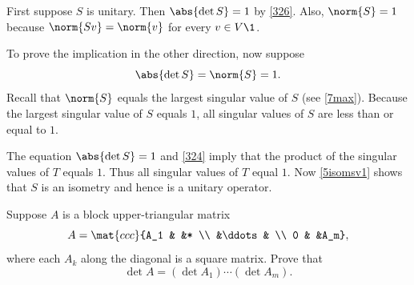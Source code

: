 \begin{Solution}
First suppose $S$ is unitary. Then $\abs{\det S} = 1$ by \ref{326}. Also, $\norm{S} = 1$ because $\norm{Sv} = \norm{v}$ for every
$v \in V\1$.

To prove the implication in the other direction, now suppose
\[
\abs{\det S} = \norm{S} = 1.
\]
Recall that $\norm{S}$ equals the largest singular value of $S$ (see \ref{7max}). Because the largest singular value of $S$ equals $1$, all singular values of $S$ are less than or equal to $1$.

The equation $\abs{\det S} = 1$ and \ref{324} imply that the product of the singular values of $T$ equals $1$. Thus all singular values of $T$ equal $1$. Now \ref{5isomsv1} shows that $S$ is an isometry and hence is a unitary operator.
\end{Solution}

\exercise
Suppose $A$ is a block upper-triangular matrix \label{blockdet}
\[
A = \mat{ccc}{A_1 & &* \\ &\ddots & \\ 0 & &A_m},
\]
where each $A_k$ along the diagonal is a square matrix.  Prove that
\[
\det A = (\det A_1) \dotsm (\det A_m).
\]
\exercisedisplayend

